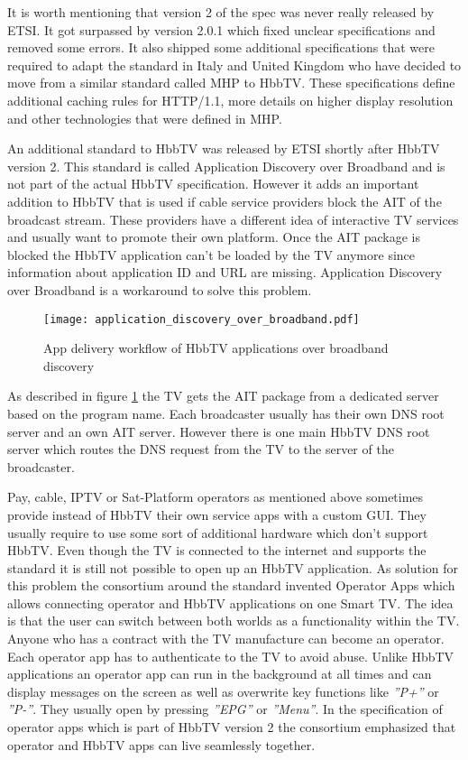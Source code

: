 It is worth mentioning that version 2 of the spec was never really released by ETSI. It got surpassed by version 2.0.1 which fixed unclear specifications and removed some errors. It also shipped some additional specifications that were required to adapt the standard in Italy and United Kingdom who have decided to move from a similar standard called MHP to HbbTV. These specifications define additional caching rules for HTTP/1.1, more details on higher display resolution and other technologies that were defined in MHP.

An additional standard to HbbTV was released by ETSI shortly after HbbTV version 2. This standard is called Application Discovery over Broadband and is not part of the actual HbbTV specification. However it adds an important addition to HbbTV that is used if cable service providers block the AIT of the broadcast stream. These providers have a different idea of interactive TV services and usually want to promote their own platform. Once the AIT package is blocked the HbbTV application can't be loaded by the TV anymore since information about application ID and URL are missing. Application Discovery over Broadband is a workaround to solve this problem.

\begin{figure}[htb]
  \centering
  \texttt{[image: application\_discovery\_over\_broadband.pdf]}\\
  \caption{App delivery workflow of HbbTV applications over broadband discovery}\label{fig:application_discovery_over_broadband}
\end{figure}

As described in figure \ref{fig:application_discovery_over_broadband} the TV gets the AIT package from a dedicated server based on the program name. Each broadcaster usually has their own DNS root server and an own AIT server. However there is one main HbbTV DNS root server which routes the DNS request from the TV to the server of the broadcaster.

Pay, cable, IPTV or Sat-Platform operators as mentioned above sometimes provide instead of HbbTV their own service apps with a custom GUI. They usually require to use some sort of additional hardware which don't support HbbTV. Even though the TV is connected to the internet and supports the standard it is still not possible to open up an HbbTV application. As solution for this problem the consortium around the standard invented Operator Apps which allows connecting operator and HbbTV applications on one Smart TV. The idea is that the user can switch between both worlds as a functionality within the TV. Anyone who has a contract with the TV manufacture can become an operator. Each operator app has to authenticate to the TV to avoid abuse. Unlike HbbTV applications an operator app can run in the background at all times and can display messages on the screen as well as overwrite key functions like \textit{''P+''} or \textit{''P-''}. They usually open by pressing \textit{''EPG''} or \textit{''Menu''}. In the specification of operator apps which is part of HbbTV version 2 the consortium emphasized that operator and HbbTV apps can live seamlessly together.

